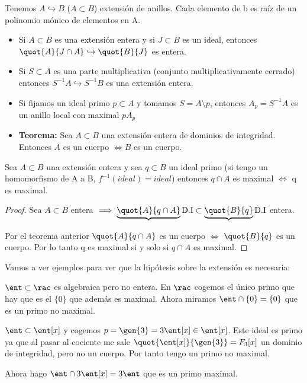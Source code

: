 Tenemos $A \hookrightarrow B$ ($A \subset B$) extensión de anillos. Cada elemento de b es raíz de un polinomio mónico de elementos en A.
\begin{itemize}
	\item Si $A \subset B$ es una extensión entera y si $J \subset B$ es un ideal, entonces $\quot{A}{J \cap A} \hookrightarrow \quot{B}{J}$ es entera.
	\item Si $S \subset A$ es una parte multiplicativa (conjunto multiplicativamente cerrado) entonces $S^{-1}A \hookrightarrow S^{-1}B$ es una extensión entera.
	\item Si fijamos un ideal primo $p \subset A$ y tomamos $S=A \setminus p$, entonces $A_p=S^{-1}A$ es un anillo local con maximal $pA_p$
	\item \textbf{Teorema:} Sea $A \subset B$ una extensión entera de dominios de integridad. Entonces $A$ es un cuerpo  $\Leftrightarrow B$ es un cuerpo.
\end{itemize}

\begin{prop} \label{prop:ExtensionMaximal}
	Sea $A \subset B$ una extensión entera y sea $q \subset B$ un ideal primo (si tengo un homomorfismo de A a B, $f^{-1}(ideal)=ideal$) entonces $q \cap A$ es maximal $\Leftrightarrow$ q es maximal.
\end{prop}

\begin{proof}
	Sea $A \subset B$ entera $\implies \underbrace{\quot{A}{q \cap A}}{\text{D.I}} \subset \underbrace{\quot{B}{q}}{\text{D.I}}$ entera.

	Por el teorema anterior $\quot{A}{q \cap A}$ es un cuerpo $\Leftrightarrow$ $\quot{B}{q}$ es un cuerpo. Por lo tanto q es maximal si y solo si $q \cap A$ es maximal.
\end{proof}


Vamos a ver ejemplos para ver que la hipótesis sobre la extensión es necesaria:
\begin{example}
	$\ent \subset \rac$ es algebraica pero no entera. En $\rac$ cogemos el único primo que hay que es el $\{0\}$ que además es maximal. Ahora miramos $\ent \cap \{0\}=\{0\}$ que es un primo no maximal.
\end{example}

\begin{example}
	$\ent \subset \ent[x]$ y cogemos $p=\gen{3}=3 \ent[x] \in \ent[x]$. Este ideal es primo ya que al pasar al cociente me sale $\quot{\ent[x]}{\gen{3}}=F_3[x]$ un dominio de integridad, pero no un cuerpo. Por tanto tengo un primo no maximal.

	Ahora hago $\ent \cap 3 \ent[x]=3 \ent$ que es un primo maximal.
\end{example}


